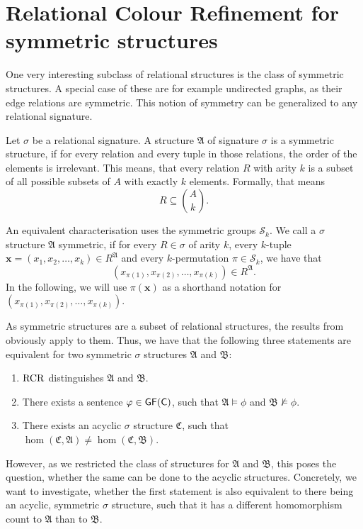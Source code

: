 \section {Relational Colour Refinement for symmetric structures}
\label{sec:RelationalColourRefinementForSymmetricStructures}

One very interesting subclass of relational structures is the class of symmetric structures.
A special case of these are for example undirected graphs, as their edge relations are symmetric.
This notion of symmetry can be generalized to any relational signature.

\begin{definition}
	Let $\sigma$ be a relational signature.
	A structure $\mathfrak A$ of signature $\sigma$ is a symmetric structure, if for every relation and every tuple in those relations, the order of the elements is irrelevant.
	This means, that every relation $R$ with arity $k$ is a subset of all possible subsets of $A$ with exactly $k$ elements.
	Formally, that means
	$$R\subseteq \binom{A}{k}.$$
\end{definition}
An equivalent characterisation uses the symmetric groups $\mathcal S_k$.
We call a $\sigma$ structure $\mathfrak A$ symmetric, if for every $R\in \sigma$ of arity $k$, every $k$-tuple $\mathbf x=(x_1,x_2,\dots,x_k)\in R^{\mathfrak A}$ and every $k$-permutation $\pi\in \mathcal S_k$, we have that
$$(x_{\pi(1)},x_{\pi(2)},\dots,x_{\pi(k)})\in R^{\mathfrak A}.$$
In the following, we will use $\pi(\mathbf x)$ as a shorthand notation for $(x_{\pi(1)},x_{\pi(2)},\dots,x_{\pi(k)})$.

As symmetric structures are a subset of relational structures, the results from \cite{scheidt2025ColorRefinement} obviously apply to them.
Thus, we have that the following three statements are equivalent for two symmetric $\sigma$ structures $\mathfrak A$ and $\mathfrak B$:
\begin{enumerate}
	\item $\operatorname{RCR}$ distinguishes $\mathfrak A$ and $\mathfrak B$.
	\item There exists a sentence $\varphi\in\mathsf{GF}(\mathsf{C})$, such that $\mathfrak A\models \phi$ and $\mathfrak B\not\models \phi$.
	\item There exists an acyclic $\sigma$ structure $\mathfrak C$, such that $\hom(\mathfrak C,\mathfrak A)\neq\hom(\mathfrak C,\mathfrak B)$.
\end{enumerate}
However, as we restricted the class of structures for $\mathfrak A$ and $\mathfrak B$, this poses the question, whether the same can be done to the acyclic structures.
Concretely, we want to investigate, whether the first statement is also equivalent to there being an acyclic, symmetric $\sigma$ structure, such that it has a different homomorphism count to $\mathfrak A$ than to $\mathfrak B$.

